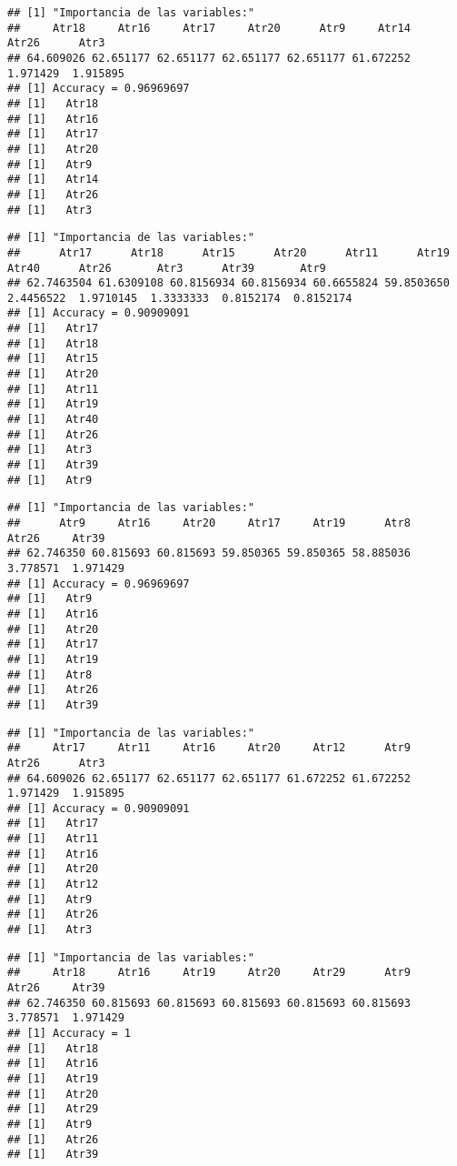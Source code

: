 \documentclass[
]{article}
\begin{document}
\begin{verbatim}
## [1] "Importancia de las variables:"
##     Atr18     Atr16     Atr17     Atr20      Atr9     Atr14     Atr26      Atr3 
## 64.609026 62.651177 62.651177 62.651177 62.651177 61.672252  1.971429  1.915895 
## [1] Accuracy = 0.96969697
## [1]   Atr18
## [1]   Atr16
## [1]   Atr17
## [1]   Atr20
## [1]   Atr9
## [1]   Atr14
## [1]   Atr26
## [1]   Atr3
\end{verbatim}

\begin{verbatim}
## [1] "Importancia de las variables:"
##      Atr17      Atr18      Atr15      Atr20      Atr11      Atr19      Atr40      Atr26       Atr3      Atr39       Atr9 
## 62.7463504 61.6309108 60.8156934 60.8156934 60.6655824 59.8503650  2.4456522  1.9710145  1.3333333  0.8152174  0.8152174 
## [1] Accuracy = 0.90909091
## [1]   Atr17
## [1]   Atr18
## [1]   Atr15
## [1]   Atr20
## [1]   Atr11
## [1]   Atr19
## [1]   Atr40
## [1]   Atr26
## [1]   Atr3
## [1]   Atr39
## [1]   Atr9
\end{verbatim}

\begin{verbatim}
## [1] "Importancia de las variables:"
##      Atr9     Atr16     Atr20     Atr17     Atr19      Atr8     Atr26     Atr39 
## 62.746350 60.815693 60.815693 59.850365 59.850365 58.885036  3.778571  1.971429 
## [1] Accuracy = 0.96969697
## [1]   Atr9
## [1]   Atr16
## [1]   Atr20
## [1]   Atr17
## [1]   Atr19
## [1]   Atr8
## [1]   Atr26
## [1]   Atr39
\end{verbatim}

\begin{verbatim}
## [1] "Importancia de las variables:"
##     Atr17     Atr11     Atr16     Atr20     Atr12      Atr9     Atr26      Atr3 
## 64.609026 62.651177 62.651177 62.651177 61.672252 61.672252  1.971429  1.915895 
## [1] Accuracy = 0.90909091
## [1]   Atr17
## [1]   Atr11
## [1]   Atr16
## [1]   Atr20
## [1]   Atr12
## [1]   Atr9
## [1]   Atr26
## [1]   Atr3
\end{verbatim}

\begin{verbatim}
## [1] "Importancia de las variables:"
##     Atr18     Atr16     Atr19     Atr20     Atr29      Atr9     Atr26     Atr39 
## 62.746350 60.815693 60.815693 60.815693 60.815693 60.815693  3.778571  1.971429 
## [1] Accuracy = 1
## [1]   Atr18
## [1]   Atr16
## [1]   Atr19
## [1]   Atr20
## [1]   Atr29
## [1]   Atr9
## [1]   Atr26
## [1]   Atr39
\end{verbatim}
\end{document}
